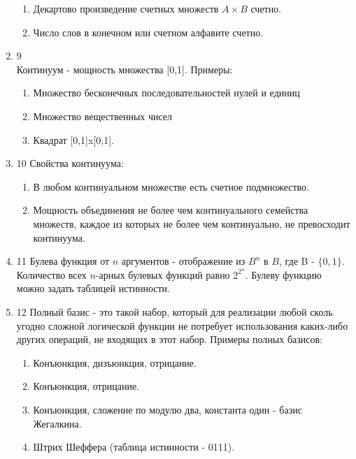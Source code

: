 \documentclass[a4paper,12pt]{article}
\begin{document}
\begin{enumerate}
\begin{enumerate}
			\item Декартово произведение счетных множеств $A \times B$ счетно.
			\item Число слов в конечном или счетном алфавите счетно.
		\end{enumerate}
		\item 9 \\
		Континуум - мощность множества [0,1]. Примеры:
		\begin{enumerate}
			\item Множество бесконечных последовательностей нулей и единиц
			\item Множество вещественных чисел
			\item Квадрат [0,1]x[0,1].
		\end{enumerate}
		\item 10
		Свойства континуума:
		\begin{enumerate}
		\item В любом континуальном множестве есть счетное подмножество.
		\item Мощность объединения не более чем континуального семейства множеств,
		каждое из которых не более чем континуально, не превосходит континуума.
		\end{enumerate}
		
		\item 11
		Булева функция от $n$ аргументов - отображение из $B^{n}$ в $B$, где B - $\{0,1\}$.
		Количество всех $n$-арных булевых функций равно $2^{2^{n}}$. Булеву функцию можно задать таблицей истинности.
		
		\item 12
		Полный базис - это такой набор, который для реализации любой сколь
		угодно сложной логической функции не потребует использования каких-либо других
		операций, не входящих в этот набор.
		Примеры полных базисов:
        
		\begin {enumerate}
		\item Конъюнкция, дизъюнкция, отрицание.
		\item Конъюнкция, отрицание.
		\item Конъюнкция, сложение по модулю два, константа один - базис Жегалкина.
		\item Штрих Шеффера (таблица истинности - 0111).
		\end {enumerate}
        

\end{enumerate}
\end{document}
